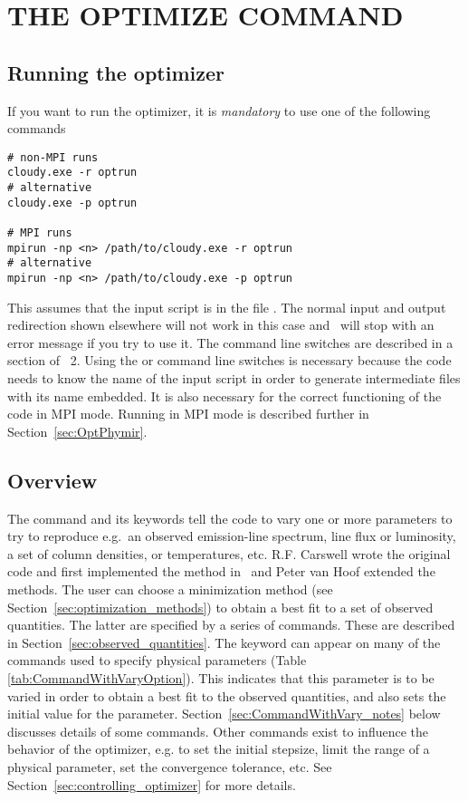 \chapter{THE OPTIMIZE COMMAND}
\label{sec:CommandOptimize}

\section{Running the optimizer}

If you want to run the optimizer, it is {\em mandatory} to use one of the
following commands
\begin{verbatim}
# non-MPI runs
cloudy.exe -r optrun
# alternative
cloudy.exe -p optrun

# MPI runs
mpirun -np <n> /path/to/cloudy.exe -r optrun
# alternative
mpirun -np <n> /path/to/cloudy.exe -p optrun
\end{verbatim}
This assumes that the input script is in the file . The
normal input and output redirection shown elsewhere will not work in this case
and \Cloudy\ will stop with an error message if you try to use it. The command
line switches are described in a section of
\Hazy~2. Using the  or  command line switches is
necessary because the code needs to know the name of the input script in order
to generate intermediate files with its name embedded. It is also necessary
for the correct functioning of the code in MPI mode. Running in MPI mode is
described further in Section~\ref{sec:OptPhymir}.

\section{Overview}

The  command and its keywords
tell the code to vary one or more
parameters to try to reproduce e.g.\ an observed emission-line spectrum,
line
flux or luminosity, a set of column densities, or temperatures, etc.
R.F. Carswell wrote the original code and first implemented
the method in \Cloudy\ 
and Peter van Hoof extended the methods.
The user can choose a minimization method (see Section~\ref{sec:optimization_methods}) to obtain a best fit
to a set of
observed quantities.
The latter
are specified by a series
of  commands.
These are described in Section~\ref{sec:observed_quantities}.
The keyword  can appear on many of the commands
used to specify physical parameters
(Table \ref{tab:CommandWithVaryOption}). This indicates
that this parameter is to be varied in order to obtain a best fit to the observed quantities,
and also sets the initial value for the parameter.
Section~\ref{sec:CommandWithVary_notes}
below discusses details of some commands.
Other commands exist to influence the behavior of the optimizer, e.g. to
set the initial stepsize, limit the range of a physical parameter,
set the convergence tolerance, etc. See Section~\ref{sec:controlling_optimizer} for more details.

